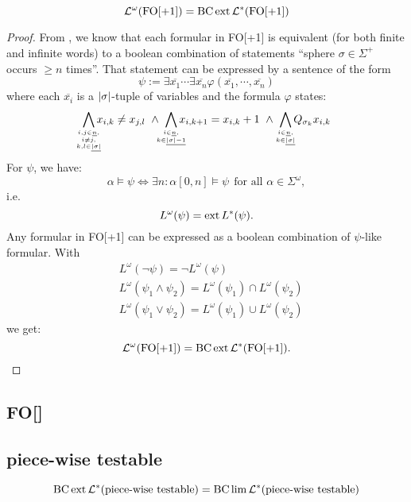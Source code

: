 \begin{thm}
\[ \mathcal{L}^\omega (\mathrm{FO[+1]}) = \operatorname{BC} \operatorname{ext} \mathcal{L}^*(\mathrm{FO[+1]}) \]
\end{thm}

\begin{proof}
From \cite[Theorem 4.8]{LangAutLogic}, we know that each formular in FO[+1] is equivalent (for both finite and infinite words) to a boolean combination of statements ``sphere $\sigma \in \Sigma^+$ occurs $\geq n$ times''. That statement can be expressed by a sentence of the form
\[ \psi := \exists \overline{x_1} \dotsb \exists \overline{x_n} \varphi(\overline{x_1}, \dotsb, \overline{x_n}) \]
where each $\overline{x_i}$ is a $\left| \sigma \right|$-tuple of variables and the formula $\varphi$ states:
\[
\bigwedge_{\mathclap{i,j \in \underline{n},\atop { i \neq j,\atop k,l \in \underline{\abs{\sigma}}}}} x_{i,k} \neq x_{j,l}
\ \wedge\ \bigwedge_{\mathclap{i \in \underline{n},\atop k \in \underline{\abs{\sigma}-1}}} x_{i,k+1} = x_{i,k} + 1
\ \wedge\ \bigwedge_{\mathclap{i \in \underline{n},\atop k \in \underline{\abs{\sigma}}}} Q_{\sigma_k} x_{i,k}
\]
For $\psi$, we have:
\[ \alpha \models \psi \Leftrightarrow \exists n \colon \alpha[0,n] \models \psi \ \ \text{for all } \alpha \in \Sigma^\omega , \]
i.e.
\[ L^\omega(\psi) = \operatorname{ext} L^*(\psi) . \]
Any formular in FO[+1] can be expressed as a boolean combination of $\psi$-like formular. With
\begin{align*}
& L^\omega(\neg \psi) = \neg L^\omega(\psi) \\
& L^\omega(\psi_1 \wedge \psi_2) = L^\omega(\psi_1) \cap L^\omega(\psi_2) \\
& L^\omega(\psi_1 \vee \psi_2) = L^\omega(\psi_1) \cup L^\omega(\psi_2)
\end{align*}
we get:
\[ \mathcal{L}^\omega(\mathrm{FO[+1]}) = \operatorname{BC} \operatorname{ext} \mathcal{L}^*(\mathrm{FO[+1]}). \]

\end{proof}

\subsection{FO[]}
\subsection{piece-wise testable}
\label{lang:PT}

\label{thm.PT}
\begin{thm}
\[ \operatorname{BC} \operatorname{ext} \mathcal{L}^* (\textup{\textrm{piece-wise testable}}) = \operatorname{BC} \lim \mathcal{L}^* (\textup{\textrm{piece-wise testable}}) \]
\end{thm}

